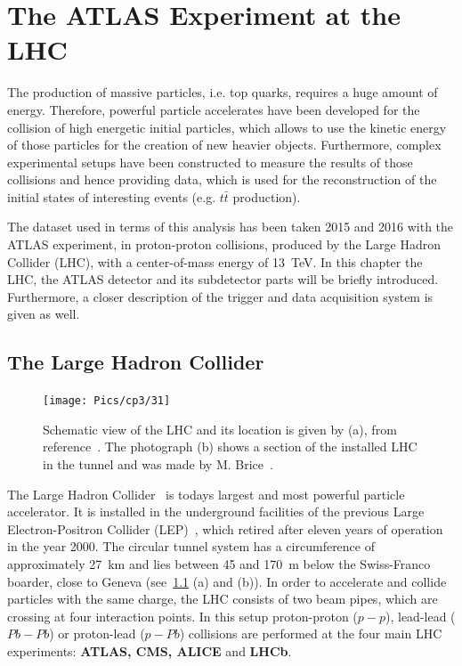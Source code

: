 \chapter{The ATLAS Experiment at the LHC}\label{ch3}

The production of massive particles, i.e. top quarks, requires a huge amount of energy. 
Therefore, powerful particle accelerates have been developed for the collision of high energetic initial particles, which allows to use the kinetic energy of those particles for the creation of new heavier objects. Furthermore, complex experimental setups have been constructed to measure the results of those collisions and hence providing data, which is used for the reconstruction of the initial states of interesting events (e.g. $t\bar{t}$ production).

 The dataset used in terms of this analysis has been taken 2015 and 2016 with the ATLAS experiment, in proton-proton collisions, produced by the Large Hadron Collider (LHC), with a center-of-mass energy of 13~TeV. In this chapter the LHC, the ATLAS detector and its subdetector parts will be briefly introduced. Furthermore, a closer description of the trigger and data acquisition system is given as well. 




\section{The Large Hadron Collider}\label{LHC}
\vspace{0.5cm}
\begin{figure}[h]
\centering
\texttt{[image: Pics/cp3/31]}
\caption{Schematic view of the LHC and its location is given by (a), from reference~\cite{Bruning:2012zz}. The photograph (b) shows a section of the installed LHC in the  tunnel and was made by M. Brice~\cite{Brice:2221112}. }
\label{fig:31}
\end{figure}

 The Large Hadron Collider~\cite{Bruning:2012zz,Bruning:2004ej,Evans:2008zzb} is todays largest and most powerful particle accelerator. It is installed in the underground facilities of the previous Large Electron-Positron Collider (LEP)~\cite{LEP}, which retired after eleven years of operation in the year 2000. The circular tunnel system has a circumference of approximately 27~km and lies between 45 and 170~m below the Swiss-Franco boarder, close to Geneva (see~\cref{fig:31} (a) and (b)). In order to accelerate and collide particles with the same charge, the LHC consists of two beam pipes, which are crossing at four interaction points. In this setup proton-proton ($p-p$), lead-lead ($Pb-Pb$) or proton-lead ($p-Pb$) collisions are performed at the four main LHC experiments: \textbf{ATLAS, CMS, ALICE} and \textbf{LHCb}.

